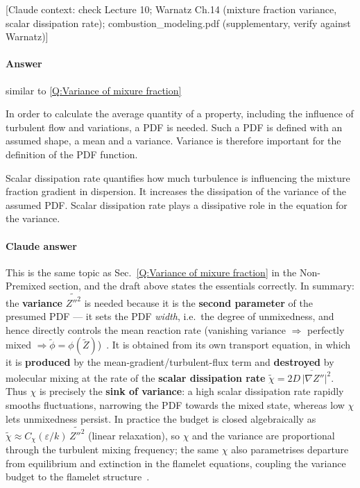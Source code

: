 {\color{gray}\footnotesize [Claude context: check Lecture 10; Warnatz Ch.14 (mixture fraction variance, scalar dissipation rate); combustion\_modeling.pdf (supplementary, verify against Warnatz)]}

\paragraph{Answer} similar to \ref{Q:Variance of mixure fraction}

In order to calculate the average quantity of a property, including the influence of turbulent flow and variations, a PDF is needed. Such a PDF is defined with an assumed shape, a mean and a variance. Variance is therefore important for the definition of the PDF function.

Scalar dissipation rate quantifies how much turbulence is influencing the mixture fraction gradient in dispersion. It increases the dissipation of the variance of the assumed PDF. Scalar dissipation rate plays a dissipative role in the equation for the variance.

{\color{istblue}
\paragraph{Claude answer}
This is the same topic as Sec.~\ref{Q:Variance of mixure fraction} in the Non-Premixed section, and the draft above states the essentials correctly. In summary: the \textbf{variance} $\widetilde{Z''^2}$ is needed because it is the \textbf{second parameter} of the presumed PDF --- it sets the PDF \emph{width}, i.e.\ the degree of unmixedness, and hence directly controls the mean reaction rate (vanishing variance $\Rightarrow$ perfectly mixed $\Rightarrow \tilde\phi=\phi(\tilde Z)$)~\cite{lecture10,veynante2002turbulent,peters2000turbulent}. It is obtained from its own transport equation, in which it is \textbf{produced} by the mean-gradient/turbulent-flux term and \textbf{destroyed} by molecular mixing at the rate of the \textbf{scalar dissipation rate} $\tilde\chi = 2\overline{D\,|\nabla Z''|^2}$. Thus $\chi$ is precisely the \textbf{sink of variance}: a high scalar dissipation rate rapidly smooths fluctuations, narrowing the PDF towards the mixed state, whereas low $\chi$ lets unmixedness persist. In practice the budget is closed algebraically as $\tilde\chi\approx C_\chi(\varepsilon/k)\,\widetilde{Z''^2}$ (linear relaxation), so $\chi$ and the variance are proportional through the turbulent mixing frequency; the same $\chi$ also parametrises departure from equilibrium and extinction in the flamelet equations, coupling the variance budget to the flamelet structure~\cite{lecture10,peters2000turbulent}.
}




